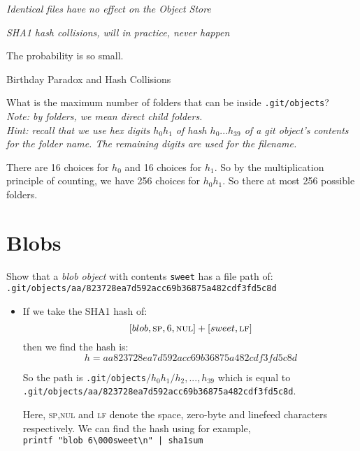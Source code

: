 \frmrule 


\textit{Identical files have no effect on the Object Store}





\frmrule 

\textit{SHA1 hash collisions, will in practice, never happen }

The probability is so small. 

\begin{sidenote}{Birthday Paradox and Hash Collisions}

\end{sidenote}


\frmrule

\begin{example}
What is the maximum number of folders that can be inside 
\lstinline{.git/objects}?
\\
\textit{Note: by folders, we mean direct child folders.}\\
\textit{Hint: recall that we use hex digits $h_0h_1$ of 
hash $h_0...h_{39}$ of a git object's contents for the 
folder name. The remaining digits are used for the filename.}

There are 16 choices for $h_0$ and 16 choices 
for $h_1$. So by the multiplication principle 
of counting, we have 256 choices for $h_0h_1$. 
So there at most 256 possible folders. 
\end{example}

\section{Blobs}

\begin{example}
Show that a \textit{blob object} with contents \lstinline{sweet} has a file path of:\\
\lstinline{.git/objects/aa/823728ea7d592acc69b36875a482cdf3fd5c8d}

\begin{itemize}
\item
If we take the SHA1 hash of:
$$[blob,\textsc{sp},6,\textsc{nul}] + [sweet,\textsc{lf}]$$
then we find the hash is:
$$h = aa823728ea7d592acc69b36875a482cdf3fd5c8d$$


So the path is \lstinline{.git}$/$\lstinline{objects}$/h_0h_1/h_2,...,h_{39}$
which is equal to \lstinline{.git/objects/aa/823728ea7d592acc69b36875a482cdf3fd5c8d}.

Here, \textsc{sp},\textsc{nul} and \textsc{lf} denote 
the space, zero-byte and linefeed characters respectively. We 
can find the hash using for example,\\ \lstinline{printf "blob 6\000sweet\n" | sha1sum}
\end{itemize}

\end{example}



